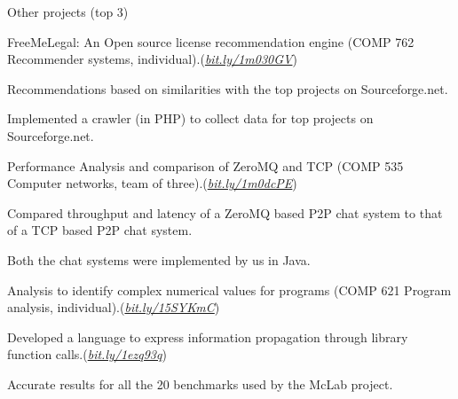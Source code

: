 \documentclass{resume} %
\begin{document}
\begin{rSection}{Other projects {\MakeLowercase{(top 3)}}}\smallskip \begin{lSubsection}
  
\item FreeMeLegal: An Open source license recommendation
engine (COMP 762 Recommender systems,
individual).(\href{http://bit.ly/1m030GV}{\em{bit.ly/1m030GV}}) 
\begin{lsubSubsection}
\item Recommendations based on similarities with the top projects on
Sourceforge.net.
\item Implemented a crawler (in {PHP}) to collect data for top projects 
on Sourceforge.net.
\end{lsubSubsection}
\item Performance
Analysis and comparison of ZeroMQ and TCP (COMP 535 Computer networks, team of
three).(\href{http://bit.ly/1m0dcPE}{\em{bit.ly/1m0dcPE}})  
\begin{lsubSubsection}
\item Compared throughput and latency of a ZeroMQ based P2P chat system to that
of a TCP based P2P chat system.
\item Both the chat systems were implemented by us in Java.
\end{lsubSubsection}

\item Analysis to identify complex numerical values for \matlab programs (COMP
621 Program analysis,
individual).(\href{https://github.com/Sable/mclab/tree/master/languages/Natlab/src/natlab/tame/valueanalysis/components/isComplex}{\em{bit.ly/15SYKmC}}) 
\begin{lsubSubsection}
\item Developed a language to express information propagation through library
function calls.(\href{http://bit.ly/1ezq93q}{\em{bit.ly/1ezq93q}})
\item Accurate results for all the 20 benchmarks used by the 
McLab project.   
\end{lsubSubsection}


\end{lSubsection}
\end{rSection}
\end{document}

